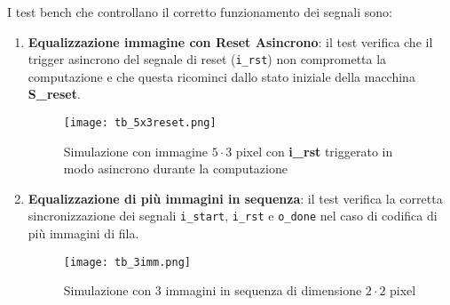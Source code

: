 \documentclass{article}
\begin{document}
\noindent I test bench che controllano il corretto funzionamento dei segnali sono:
\vspace{0.2cm}
\begin{enumerate}
	\item \textbf{Equalizzazione immagine con Reset Asincrono}: il test verifica che il trigger asincrono del segnale di reset (\verb^i_rst^) non comprometta la computazione e che questa ricominci dallo stato iniziale della macchina \textbf{S\_reset}.
	\vspace{0.1cm}
	\begin{figure}[H]
		\centering
		\texttt{[image: tb\_5x3reset.png]}
		\caption{Simulazione con immagine $5\cdot3$ pixel con \textbf{i\_rst} triggerato in modo asincrono durante la computazione}
		\label{fig:TBReset}
	\end{figure}
	
	\item \textbf{Equalizzazione di più immagini in sequenza}: il test verifica la corretta sincronizzazione dei segnali \verb^i_start^, \verb^i_rst^ e \verb^o_done^ nel caso di codifica di più immagini di fila.
	\vspace{0.1cm}
	\begin{figure}[H]
		\centering
		\texttt{[image: tb\_3imm.png]}
		\caption{Simulazione con 3 immagini in sequenza di dimensione $2\cdot2$ pixel}
		\label{fig:TB3imm}
	\end{figure}
\end{enumerate}
\end{document}
